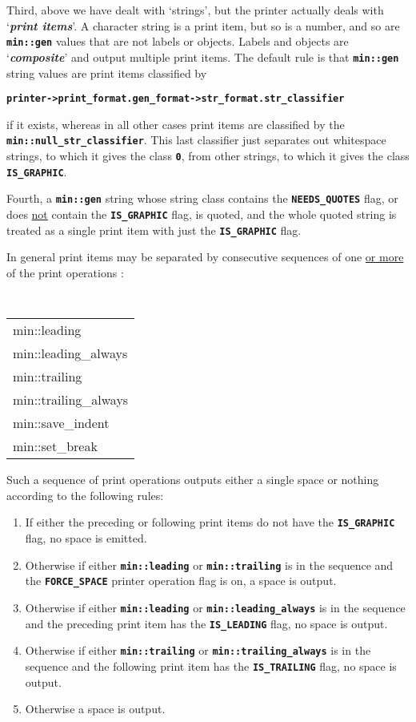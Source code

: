 \documentclass[12pt]{article}
\newcommand{\TT}[1]{{\tt \bfseries #1}}
\newcommand{\TTALL}{\tt \bfseries}
\newcommand{\key}[1]{{\bf \em #1}\index{#1}}
\newcommand{\ikey}[2]{{\bf \em #1}\index{#2}}
\newcommand{\EOL}{\penalty \exhyphenpenalty}
\begin{document}
Third, above we have dealt with `strings', but the printer actually
deals with
`\ikey{print items}{print item}'\label{PRINT-ITEM}.
A character string is a print item, but so is a number, and so are
\TT{min::gen} values that are not labels or objects.  Labels and
objects are `\key{composite}' and output multiple print items.
The default rule is that \TT{min::gen} string values are print
items classified by

\begin{center}
\TT{printer->print\_format.gen\_format->str\_format.str\_classifier}
\end{center}

if it exists, whereas in all other cases print items are classified by
the \TT{min::\EOL null\_\EOL str\_\EOL classifier}.
This last classifier just separates out whitespace strings, to which
it gives the class \TT{0}, from other strings, to which it gives
the class \TT{IS\_\EOL GRAPHIC}.

Fourth, a \TT{min::gen} string whose string class contains the
\TT{NEEDS\_\EOL QUOTES} flag, or does \underline{not}
contain the \TT{IS\_\EOL GRAPHIC} flag, is quoted,
and the whole quoted string is treated as a single print item with just the
\TT{IS\_\EOL GRAPHIC} flag.

In general print items may be separated by
consecutive sequences of one \underline{or more} of the print operations
\label{LEADING-TRAILING-RULES}:
\begin{center}
\TTALL
\begin{tabular}{l}
min::leading \\
min::leading\_always \\
min::trailing \\
min::trailing\_always \\
min::save\_indent \\
min::set\_break \\
\end{tabular}
\end{center}
Such a sequence of print operations outputs either a single space or
nothing according to the following rules:
\begin{enumerate}
\item If either the preceding or following print items do not have the
\TT{IS\_\EOL GRAPHIC} flag, no space is emitted.
\item Otherwise if either \TT{min::leading} or \TT{min::trailing}
is in the sequence and the \TT{FORCE\_\EOL SPACE} printer\label{FORCE_SPACE}
operation flag is on, a space is output.
\item Otherwise if either \TT{min::leading} or \TT{min::leading\_\EOL always}
is in the sequence and the preceding print item has the \TT{IS\_\EOL LEADING}
flag, no space is output.
\item Otherwise if either \TT{min::trailing} or \TT{min::trailing\_\EOL always}
is in the sequence and the following print item has the \TT{IS\_\EOL TRAILING}
flag, no space is output.
\item Otherwise a space is output.
\end{enumerate}
\end{document}

